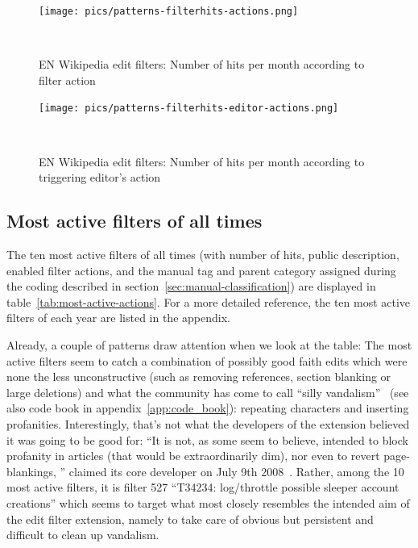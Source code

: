 \begin{figure}
\centering
  \texttt{[image: pics/patterns-filterhits-actions.png]}
  \caption{EN Wikipedia edit filters: Number of hits per month according to filter action}~\label{fig:filter-hits-actions}
\end{figure}

\begin{figure}
\centering
  \texttt{[image: pics/patterns-filterhits-editor-actions.png]}
  \caption{EN Wikipedia edit filters: Number of hits per month according to triggering editor's action}~\label{fig:filter-hits-editors-actions}
\end{figure}

\subsection{Most active filters of all times}

The ten most active filters of all times (with number of hits, public description, enabled filter actions, and the manual tag and parent category assigned during the coding described in section~\ref{sec:manual-classification}) are displayed in table~\ref{tab:most-active-actions}.
For a more detailed reference, the ten most active filters of each year are listed in the appendix. %

Already, a couple of patterns draw attention when we look at the table:
The most active filters seem to catch a combination of possibly good faith edits which were none the less unconstructive (such as removing references, section blanking or large deletions)
and what the community has come to call ``silly vandalism''~\cite{Wikipedia:VandalismTypes} (see also code book in appendix~\ref{app:code_book}): repeating characters and inserting profanities.
Interestingly, that's not what the developers of the extension believed it was going to be good for:
``It is not, as some seem to believe, intended to block profanity in articles (that would be extraordinarily dim), nor even to revert page-blankings, '' claimed its core developer on July 9th 2008~\cite{Wikipedia:EditFilterTalkArchive1Clarification}.
Rather, among the 10 most active filters, it is filter 527 ``T34234: log/throttle possible sleeper account creations'' which seems to target what most closely resembles the intended aim of the edit filter extension, namely to take care of obvious but persistent and difficult to clean up vandalism.


